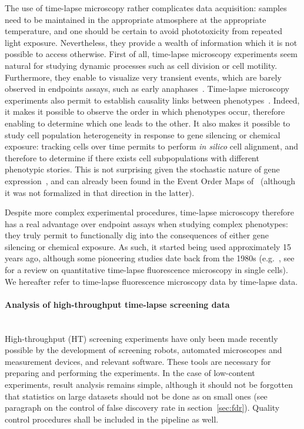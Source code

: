 The use of time-lapse microscopy rather complicates data acquisition: samples need to be maintained in the appropriate atmosphere at the appropriate temperature, and one should be certain to avoid phototoxicity from repeated light exposure. Nevertheless, they provide a wealth of information which it is not possible to access otherwise. First of all, time-lapse microscopy experiments seem natural for studying dynamic processes such as cell division or cell motility. Furthermore, they enable to visualize very transient events, which are barely observed in endpoints assays, such as early anaphases~\cite{pmid20360735}. Time-lapse microscopy experiments also permit to establish causality links between phenotypes~\cite{pmid15539606}. Indeed, it makes it possible to observe the order in which phenotypes occur, therefore enabling to determine which one leads to the other. It also makes it possible to study cell population heterogeneity in response to gene silencing or chemical exposure: tracking cells over time permits to perform \textit{in silico} cell alignment, and therefore to determine if there exists cell subpopulations with different phenotypic stories. This is not surprising given the stochastic nature of gene expression~\cite{pmid18957198}, and can already been found in the Event Order Maps of~\cite{pmid20360735} (although it was not formalized in that direction in the latter). 

Despite more complex experimental procedures, time-lapse microscopy therefore has a real advantage over endpoint assays when studying complex phenotypes: they truly permit to functionally dig into the consequences of either gene silencing or chemical exposure. As such, it started being used approximately 15 years ago, although some pioneering studies date back from the 1980s (e.g.~\cite{pmid6684600}, see~\cite{pmid19575655} for a review on quantitative time-lapse fluorescence microscopy in single cells). We hereafter refer to time-lapse fluorescence microscopy data by time-lapse data.

\paragraph*{Analysis of high-throughput time-lapse screening data}
~\\ High-throughput (HT) screening experiments have only been made recently possible by the development of screening robots, automated microscopes and measurement devices, and relevant software. These tools are necessary for preparing and performing the experiments. In the case of low-content experiments, result analysis remains simple, although it should not be forgotten that statistics on large datasets should not be done as on small ones (see paragraph on the control of false discovery rate in section~\ref{sec:fdr}). Quality control procedures shall be included in the pipeline as well.

